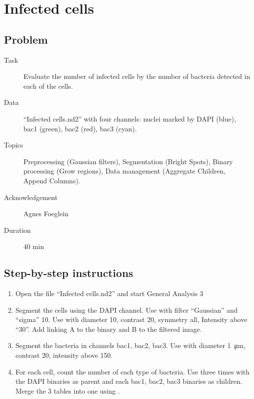 \section{Infected cells}

\subsection{Problem}




\begin{description}
    \item[Task] Evaluate the number of infected cells by the number of bacteria detected in each of the cells. 
    \item[Data] ``Infected cells.nd2'' with four channels: nuclei marked by DAPI (blue), bac1 (green), bac2 (red), bac3 (cyan).
    \item[Topics] Preprocessing (Gaussian filters), Segmentation (Bright Spots), Binary processing (Grow regions), Data management (Aggregate Children, Append Columns).
    \item[Acknowledgement] Agnes Foeglein
    \item[Duration] 40 min
\end{description}



\subsection{Step-by-step instructions}
\begin{enumerate}
    \item Open the file ``Infected cells.nd2'' and start General Analysis 3
    \item Segment the cells using the DAPI channel. \soln Use  with filter ``Gaussian'' and ``sigma'' 10. Use  with diameter 10, contrast 20, symmetry all, Intensity above ``30''. Add  linking A to the binary and B to the filtered image. \solnend
    \item Segment the bacteria in channels bac1, bac2, bac3. \soln Use  with diameter \SI{1}{\micro\meter}, contrast 20, intensity above 150. \solnend
    \item For each cell, count the number of each type of bacteria. \soln Use  three times with the DAPI binaries as parent and each bac1, bac2, bac3 binaries as children. Merge the 3 tables into one using . \solnend
\end{enumerate}
